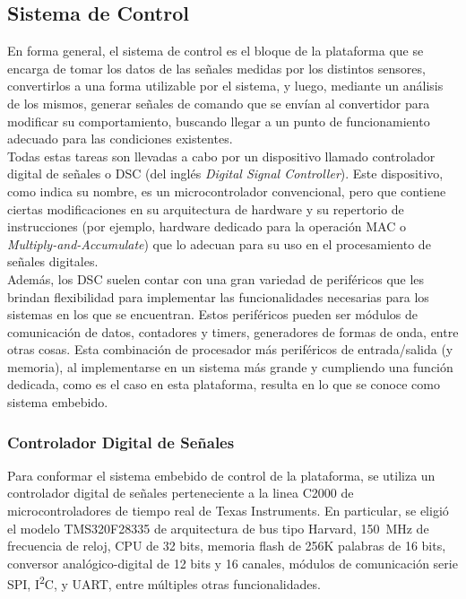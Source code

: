 \subsection{Sistema de Control}

En forma general, el sistema de control es el bloque de la plataforma que se encarga de tomar los datos de las señales medidas por los distintos sensores, convertirlos a una forma utilizable por el sistema, y luego, mediante un análisis de los mismos, generar señales de comando que se envían al convertidor para modificar su comportamiento, buscando llegar a un punto de funcionamiento adecuado para las condiciones existentes.\\

Todas estas tareas son llevadas a cabo por un dispositivo llamado {\Medium controlador digital de señales} o DSC (del inglés \textit{Digital Signal Controller}). Este dispositivo, como indica su nombre, es un microcontrolador convencional, pero que contiene ciertas modificaciones en su arquitectura de hardware y su repertorio de instrucciones (por ejemplo, hardware dedicado para la operación MAC o \textit{Multiply-and-Accumulate}) que lo adecuan para su uso en el procesamiento de señales digitales.\\

Además, los DSC suelen contar con una gran variedad de periféricos que les brindan flexibilidad para implementar las funcionalidades necesarias para los sistemas en los que se encuentran. Estos periféricos pueden ser módulos de comunicación de datos, contadores y timers, generadores de formas de onda, entre otras cosas. Esta combinación de procesador más periféricos de entrada/salida (y memoria), al implementarse en un sistema más grande y cumpliendo una función dedicada, como es el caso en esta plataforma, resulta en lo que se conoce como {\Medium sistema embebido}.\\

\subsubsection{Controlador Digital de Señales}

Para conformar el sistema embebido de control de la plataforma, se utiliza un controlador digital de señales perteneciente a la linea {\Medium C2000} de microcontroladores de tiempo real de Texas Instruments. En particular, se eligió el modelo {\Medium TMS320F28335} de arquitectura de bus tipo Harvard, \SI[]{150}{\mega\hertz} de frecuencia de reloj, CPU de 32 bits, memoria flash de 256K palabras de 16 bits, conversor analógico-digital de 12 bits y 16 canales, módulos de comunicación serie SPI, I\textsuperscript{2}C, y UART, entre múltiples otras funcionalidades.\textsuperscript{\cite{DSP-Datasheet}}\\

